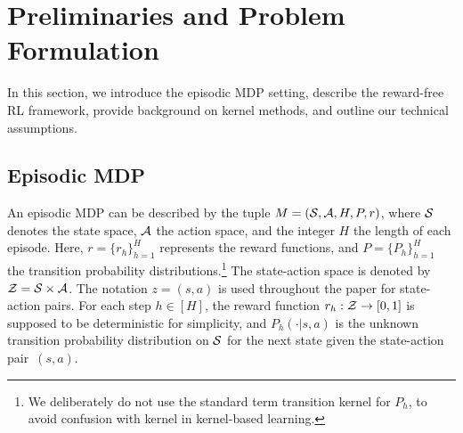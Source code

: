 \section{Preliminaries and Problem Formulation}\label{sec:pf}

In this section, we introduce the episodic MDP setting, describe the reward-free RL framework, provide background on kernel methods, and outline our technical assumptions.

\subsection{Episodic MDP}
An episodic MDP can be described by the tuple $M=(\mathcal{S},\mathcal{A}, H, P, r)$, where $\mathcal{S}$ denotes the state space, $\mathcal{A}$ the action space, and the integer $H$ the length of each episode. Here, $r=\{r_h\}_{h=1}^H$ represents the reward functions, and $P=\{P_h\}_{h=1}^H$ the transition probability distributions.\footnote{We deliberately do not use the standard term transition kernel for $P_h$, to avoid confusion with kernel in kernel-based learning.}
The state-action space is denoted by $\mathcal{Z}=\mathcal{S}\times\mathcal{A}$. The notation $z=(s,a)$ is used throughout the paper for state-action pairs. For each step $h\in[H]$, the reward function $r_h: \mathcal{Z}\rightarrow [0,1]$ is supposed to be deterministic for simplicity, and $P_h(\cdot|s,a)$ is the unknown transition probability distribution on $\mathcal{S}$ for the next state given the state-action pair~$(s,a)$.

%
%

